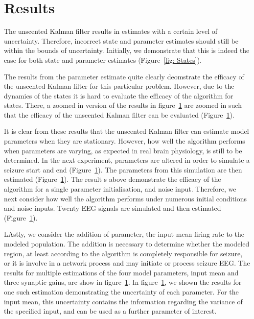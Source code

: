 \section{Results}

The unscented Kalman filter results in estimates with a certain level of uncertainty. Therefore, incorrect state and parameter estimates should still be within the bounds of uncertainty. Initially, we demonstrate that this is indeed the case for both state and parameter estimates (Figure~\ref{fig: States}).


The results from the parameter estimate quite clearly deomstrate the efficacy of the unscented Kalman filter for this particular problem. However, due to the dynamics of the states it is hard to evaluate the efficacy of the algorithm for states. There, a zoomed in version of the results in figure~\ref{} are zoomed in such that the efficacy of the unscented Kalman filter can be evaluated (Figure~\ref{}).

It is clear from these results that the unscented Kalman filter can estimate model parameters when they are stationary. However, how well the algorithm performs when parameters are varying, as expected in real brain physiology, is still to be determined. In the next experiment, parameters are altered in order to simulate a seizure start and end (Figure~\ref{}). The parameters from this simulation are then estimated (Figure~\ref{}). The result s above demonstrate the efficacy of the algorithm for a single parameter initialisation, and noise input. Therefore, we next consider how well the algorithm performs under numerous initial conditions and noise inputs. Twenty EEG signals are simulated and then estimated (Figure~\ref{}). 

LAstly, we consider the addition of parameter, the input mean firing rate to the modeled population. The addition is necessary to determine whether the modeled region, at least according to the algorithm is completely responsible for seizure, or it is involve in a network process and may initiate or process seizure EEG. The results for multiple estimations of the four model parameters, input mean and three synaptic gains, are show in figure~\ref{}. In figure~\ref{}, we shown the results for one such estimation demonstrating the uncertainty of each parameter. For the input mean, this uncertainty contains the information regarding the variance of the specified input, and can be used as a further parameter of interest.